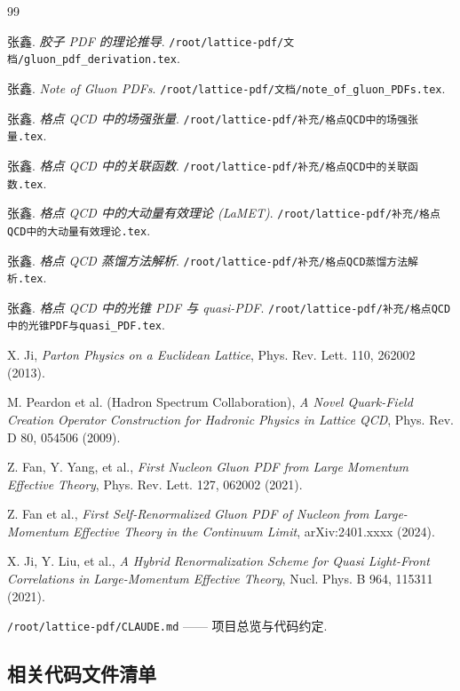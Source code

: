 \documentclass[12pt,a4paper]{ctexart}
\begin{document}
\begin{thebibliography}{99}

张鑫. \textit{胶子 PDF 的理论推导}.
\texttt{/root/lattice-pdf/文档/gluon\_pdf\_derivation.tex}.

张鑫. \textit{Note of Gluon PDFs}.
\texttt{/root/lattice-pdf/文档/note\_of\_gluon\_PDFs.tex}.

张鑫. \textit{格点 QCD 中的场强张量}.
\texttt{/root/lattice-pdf/补充/格点QCD中的场强张量.tex}.

张鑫. \textit{格点 QCD 中的关联函数}.
\texttt{/root/lattice-pdf/补充/格点QCD中的关联函数.tex}.

张鑫. \textit{格点 QCD 中的大动量有效理论 (LaMET)}.
\texttt{/root/lattice-pdf/补充/格点QCD中的大动量有效理论.tex}.

张鑫. \textit{格点 QCD 蒸馏方法解析}.
\texttt{/root/lattice-pdf/补充/格点QCD蒸馏方法解析.tex}.

张鑫. \textit{格点 QCD 中的光锥 PDF 与 quasi-PDF}.
\texttt{/root/lattice-pdf/补充/格点QCD中的光锥PDF与quasi\_PDF.tex}.

X. Ji, \textit{Parton Physics on a Euclidean Lattice},
Phys. Rev. Lett. 110, 262002 (2013).

M. Peardon et al. (Hadron Spectrum Collaboration),
\textit{A Novel Quark-Field Creation Operator Construction for Hadronic Physics in Lattice QCD},
Phys. Rev. D 80, 054506 (2009).

Z. Fan, Y. Yang, et al.,
\textit{First Nucleon Gluon PDF from Large Momentum Effective Theory},
Phys. Rev. Lett. 127, 062002 (2021).

Z. Fan et al.,
\textit{First Self-Renormalized Gluon PDF of Nucleon from Large-Momentum Effective Theory in the Continuum Limit},
arXiv:2401.xxxx (2024).

X. Ji, Y. Liu, et al.,
\textit{A Hybrid Renormalization Scheme for Quasi Light-Front Correlations in Large-Momentum Effective Theory},
Nucl. Phys. B 964, 115311 (2021).

\texttt{/root/lattice-pdf/CLAUDE.md} —— 项目总览与代码约定.

\end{thebibliography}

\subsection{相关代码文件清单}
\end{document}
